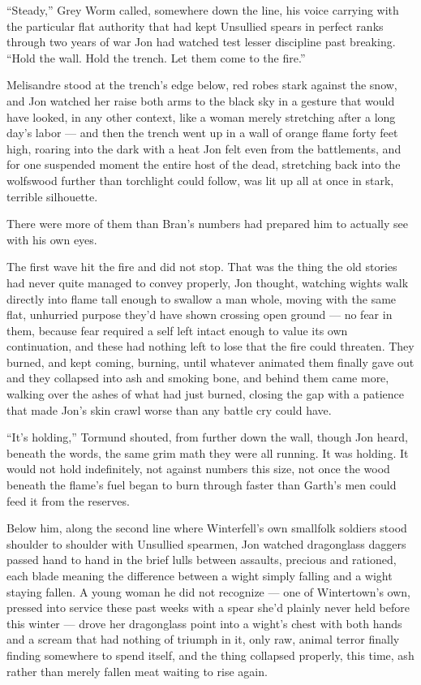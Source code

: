 “Steady,” Grey Worm called, somewhere down the line, his voice carrying with the particular flat authority that had kept Unsullied spears in perfect ranks through two years of war Jon had watched test lesser discipline past breaking. “Hold the wall. Hold the trench. Let them come to the fire.”

Melisandre stood at the trench’s edge below, red robes stark against the snow, and Jon watched her raise both arms to the black sky in a gesture that would have looked, in any other context, like a woman merely stretching after a long day’s labor — and then the trench went up in a wall of orange flame forty feet high, roaring into the dark with a heat Jon felt even from the battlements, and for one suspended moment the entire host of the dead, stretching back into the wolfswood further than torchlight could follow, was lit up all at once in stark, terrible silhouette.

There were more of them than Bran’s numbers had prepared him to actually see with his own eyes.

\sceneBreak

The first wave hit the fire and did not stop. That was the thing the old stories had never quite managed to convey properly, Jon thought, watching wights walk directly into flame tall enough to swallow a man whole, moving with the same flat, unhurried purpose they’d have shown crossing open ground — no fear in them, because fear required a self left intact enough to value its own continuation, and these had nothing left to lose that the fire could threaten. They burned, and kept coming, burning, until whatever animated them finally gave out and they collapsed into ash and smoking bone, and behind them came more, walking over the ashes of what had just burned, closing the gap with a patience that made Jon’s skin crawl worse than any battle cry could have.

“It’s holding,” Tormund shouted, from further down the wall, though Jon heard, beneath the words, the same grim math they were all running. It was holding. It would not hold indefinitely, not against numbers this size, not once the wood beneath the flame’s fuel began to burn through faster than Garth’s men could feed it from the reserves.

Below him, along the second line where Winterfell’s own smallfolk soldiers stood shoulder to shoulder with Unsullied spearmen, Jon watched dragonglass daggers passed hand to hand in the brief lulls between assaults, precious and rationed, each blade meaning the difference between a wight simply falling and a wight staying fallen. A young woman he did not recognize — one of Wintertown’s own, pressed into service these past weeks with a spear she’d plainly never held before this winter — drove her dragonglass point into a wight’s chest with both hands and a scream that had nothing of triumph in it, only raw, animal terror finally finding somewhere to spend itself, and the thing collapsed properly, this time, ash rather than merely fallen meat waiting to rise again.

